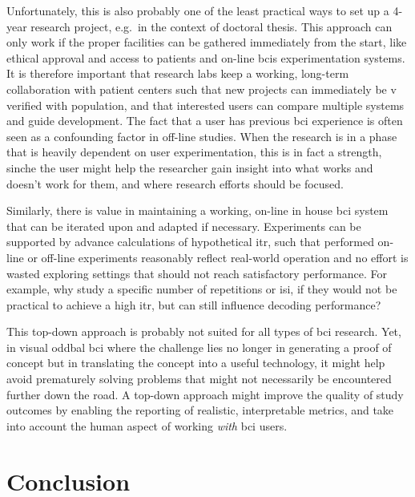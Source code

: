Unfortunately, this is also probably one of the least practical ways to set up
a 4-year research project, e.g.\ in the context of doctoral thesis.
This approach can only work if the proper facilities can be gathered immediately
from the start, like ethical approval and access to patients and on-line \acp{bci}
experimentation systems.
It is therefore important that research labs keep a working, long-term
collaboration with patient centers such that new projects can immediately be v
verified with population, and that interested users can compare multiple systems
and guide development.
The fact that a user has previous \ac{bci} experience is often seen as a confounding
factor in off-line studies.
When the research is in a phase that is heavily dependent on user
experimentation,
this is in fact a strength, sinche the user might help the researcher gain
insight into what works and doesn't work for them, and where research efforts
should be focused.

Similarly, there is value in maintaining a working, on-line in house \ac{bci}
system that can be iterated upon and adapted if necessary.
Experiments can be supported by advance calculations of hypothetical
\ac{itr}, such that performed on-line or off-line experiments reasonably reflect
real-world operation and no effort is wasted exploring settings that should not
reach satisfactory performance.
For example, why study a specific number of repetitions or \ac{isi}, if they
would not be practical to achieve a high \ac{itr}, but can still influence
decoding performance?

This top-down approach is probably not suited for all types of \ac{bci}
research.
Yet, in visual oddbal \ac{bci} where the challenge lies no longer in generating
a proof of concept but in translating the concept into a useful technology, it
might help avoid prematurely solving problems that might not necessarily be
encountered further down the road.
A top-down approach might improve the quality of study outcomes by enabling the
reporting of realistic, interpretable metrics,
and take into account the human aspect of working \emph{with} \ac{bci} users.


\section{Conclusion}

